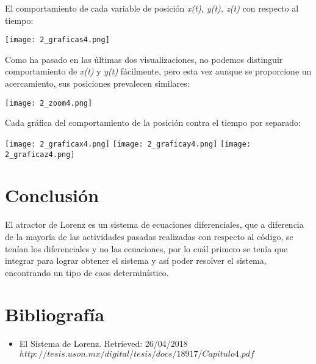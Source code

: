 \documentclass{article}
\begin{document}
El comportamiento de cada variable de posición \textit{x(t), y(t), z(t)} con respecto al tiempo:

	\begin{center}
    \texttt{[image: 2\_graficas4.png]}
    \end{center}

Como ha pasado en las últimas dos visualizaciones, no podemos distinguir comportamiento de \textit{x(t)} y \textit{y(t)} fácilmente, pero esta vez aunque se proporcione un acercamiento, sus posiciones prevalecen similares:

    \begin{center}
    \centering
    \texttt{[image: 2\_zoom4.png]}
    \end{center}

Cada gráfica del comportamiento de la posición contra el tiempo por separado:

	\begin{center}
    \centering
    \texttt{[image: 2\_graficax4.png]}
	\texttt{[image: 2\_graficay4.png]}
    \texttt{[image: 2\_graficaz4.png]}
    \end{center}

\section{Conclusión}
El atractor de Lorenz es un sistema de ecuaciones diferenciales, que a diferencia de la mayoría de las actividades pasadas realizadas con respecto al código, se tenían los diferenciales y no las ecuaciones, por lo cuál primero se tenía que integrar para lograr obtener el sistema y así poder resolver el sistema, encontrando un tipo de caos determinístico.

\section{Bibliografía}
\begin{itemize}
\item El Sistema de Lorenz. Retrieved: 26/04/2018
$http://tesis.uson.mx/digital/tesis/docs/18917/Capitulo4.pdf$
\end{itemize}
\end{document}
